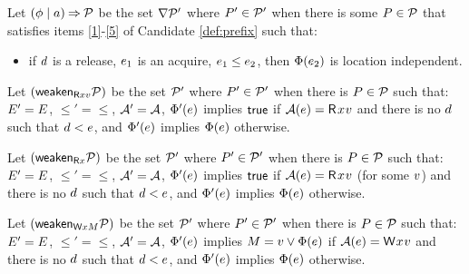 \begin{definition}
  \label{def:cover}
  Let $(\phi \mid a) \mathbin\Rightarrow \mathcal{P}$ be the set $\nabla \mathcal{P}'$ %
  where $P'\in\mathcal{P}'$ when there is some $P\in\mathcal{P}$ that satisfies
  items \ref{1}-\ref{5} of Candidate \ref{def:prefix} such that:
  \begin{itemize}
  \item[{\labeltext[6]{(6)}{6}}]
    if $d$ is a release, $e_1$ is an acquire, $e_1\le e_2$, then $\Phi(e_2)$
    is location independent.
  \end{itemize}  
  
  Let $(\mathsf{weaken}_{\mathsf{R}xv}\mathcal{P})$ be the set $\mathcal{P}'$ where $P'\in\mathcal{P}'$
  when there is $P\in\mathcal{P}$ such that: $E' = E$, ${\le'} = {\le}$,
  $\mathcal{A}' = \mathcal{A}$, 
  $\Phi'(e)$ implies $\mathsf{true}$ if  $\labelingAct(\aEv)=\DR[\modeRLXquiet]{\aLoc}{\aVal}$ and
  there is no  $d$  such that $d<e$, and $\Phi'(e)$ implies $\Phi(e)$ otherwise.

  Let $(\mathsf{weaken}_{\mathsf{R}x}\mathcal{P})$ be the set $\mathcal{P}'$ where $P'\in\mathcal{P}'$
  when there is $P\in\mathcal{P}$ such that: $E' = E$, ${\le'} = {\le}$,
  $\mathcal{A}' = \mathcal{A}$, 
  $\Phi'(e)$ implies $\mathsf{true}$ if
  $\labelingAct(\aEv)=\DR[\modeRLXquiet]{\aLoc}{\aVal}$ (for some $v$) and
  there is no  $d$  such that $d<e$, and $\Phi'(e)$ implies $\Phi(e)$ otherwise.

  Let $(\mathsf{weaken}_{\mathsf{W}xM}\mathcal{P})$ be the set $\mathcal{P}'$ where $P'\in\mathcal{P}'$
  when there is $P\in\mathcal{P}$ such that: $E' = E$, ${\le'} = {\le}$,
  $\mathcal{A}' = \mathcal{A}$, 
  $\Phi'(e)$ implies $M=v\lor\Phi(e)$ if $\labelingAct(\aEv)=\DW[\modeRLXquiet]{\aLoc}{\aVal}$ and
  there is no $d$  such that $d<e$, and $\Phi'(e)$ implies $\Phi(e)$ otherwise.
  

\end{definition}
